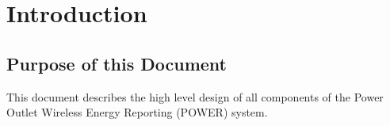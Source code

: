 \chapter{Introduction}

\section{Purpose of this Document}
This document describes the high level design of all components of the Power Outlet Wireless Energy Reporting (POWER) system.